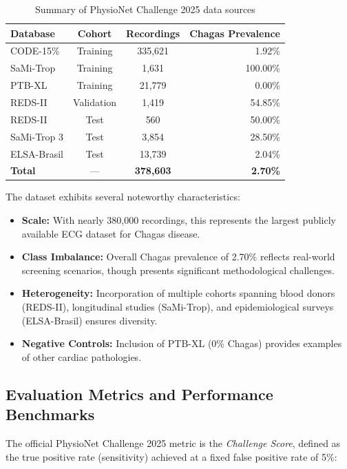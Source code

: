 \begin{table}[h]
\centering
\caption{Summary of PhysioNet Challenge 2025 data sources}
\label{tab:challenge_data}
\begin{tabular}{lccr}
\hline
\textbf{Database} & \textbf{Cohort} & \textbf{Recordings} & \textbf{Chagas Prevalence} \\
\hline
CODE-15\% & Training & 335,621 & 1.92\% \\
SaMi-Trop & Training & 1,631 & 100.00\% \\
PTB-XL & Training & 21,779 & 0.00\% \\
REDS-II & Validation & 1,419 & 54.85\% \\
REDS-II & Test & 560 & 50.00\% \\
SaMi-Trop 3 & Test & 3,854 & 28.50\% \\
ELSA-Brasil & Test & 13,739 & 2.04\% \\
\hline
\textbf{Total} & --- & \textbf{378,603} & \textbf{2.70\%} \\
\hline
\end{tabular}
\end{table}

The dataset exhibits several noteworthy characteristics:
\begin{itemize}
    \item \textbf{Scale:} With nearly 380,000 recordings, this represents the largest publicly available ECG dataset for Chagas disease.
    \item \textbf{Class Imbalance:} Overall Chagas prevalence of 2.70\% reflects real-world screening scenarios, though presents significant methodological challenges.
    \item \textbf{Heterogeneity:} Incorporation of multiple cohorts spanning blood donors (REDS-II), longitudinal studies (SaMi-Trop), and epidemiological surveys (ELSA-Brasil) ensures diversity.
    \item \textbf{Negative Controls:} Inclusion of PTB-XL (0\% Chagas) provides examples of other cardiac pathologies.
\end{itemize}

\subsection{Evaluation Metrics and Performance Benchmarks}

The official PhysioNet Challenge 2025 metric is the \textit{Challenge Score}, defined as the true positive rate (sensitivity) achieved at a fixed false positive rate of 5\%:

